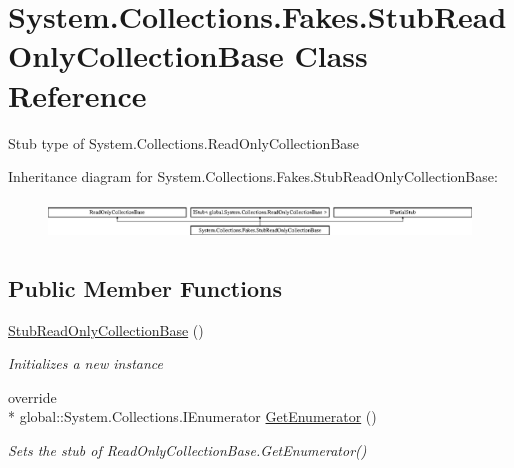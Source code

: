 \hypertarget{class_system_1_1_collections_1_1_fakes_1_1_stub_read_only_collection_base}{\section{System.\-Collections.\-Fakes.\-Stub\-Read\-Only\-Collection\-Base Class Reference}
\label{class_system_1_1_collections_1_1_fakes_1_1_stub_read_only_collection_base}
}


Stub type of System.\-Collections.\-Read\-Only\-Collection\-Base 


Inheritance diagram for System.\-Collections.\-Fakes.\-Stub\-Read\-Only\-Collection\-Base\-:\begin{figure}[H]
\begin{center}
\leavevmode
\includegraphics[height=1.037037cm]{class_system_1_1_collections_1_1_fakes_1_1_stub_read_only_collection_base}
\end{center}
\end{figure}
\subsection*{Public Member Functions}
\begin{DoxyCompactItemize}
\item 
\hyperlink{class_system_1_1_collections_1_1_fakes_1_1_stub_read_only_collection_base_a731c402b8c10f9aeb606d4900bd330b2}{Stub\-Read\-Only\-Collection\-Base} ()
\begin{DoxyCompactList}\small\item\em Initializes a new instance\end{DoxyCompactList}\item 
override \\*
global\-::\-System.\-Collections.\-I\-Enumerator \hyperlink{class_system_1_1_collections_1_1_fakes_1_1_stub_read_only_collection_base_a24835d3308058e16cc67c07b09439d59}{Get\-Enumerator} ()
\begin{DoxyCompactList}\small\item\em Sets the stub of Read\-Only\-Collection\-Base.\-Get\-Enumerator()\end{DoxyCompactList}\end{DoxyCompactItemize}
